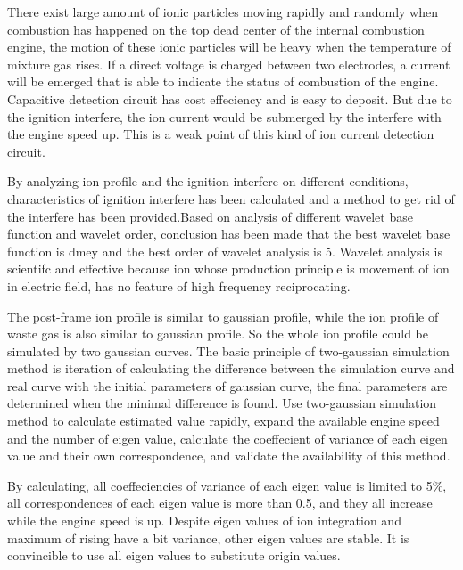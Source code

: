 \begin{eabstract}
There exist large amount of ionic particles moving rapidly and randomly when combustion has happened on the top dead
 center of the internal combustion engine, the motion of these ionic particles will be heavy when the temperature of 
 mixture gas rises. If a direct voltage is charged between two electrodes, a current will be emerged that is able to indicate
 the status of combustion of the engine. Capacitive detection circuit has cost effeciency and is easy to deposit. 
But due to the ignition interfere, the ion current would be submerged by the interfere with the engine speed up.
This is a weak point of this kind of ion current detection circuit.\par
By analyzing ion profile and the ignition interfere on different conditions, characteristics of ignition interfere has been calculated and 
a method to get rid of the interfere has been provided.Based on analysis of different wavelet base function and wavelet order, conclusion has
been made that the best wavelet base function is dmey and the best order of wavelet analysis is 5. Wavelet analysis is scientifc and effective because
 ion whose production principle is movement of ion in electric field,  has no feature of high frequency reciprocating. \par
 The post-frame ion profile is similar to gaussian profile, while the ion profile of waste gas is also similar to gaussian profile. So the whole
 ion profile could be simulated by two gaussian curves. The basic principle of two-gaussian simulation method is iteration of calculating the difference between
  the simulation curve and real curve with the initial parameters of gaussian curve, the final parameters are determined when the minimal difference is found.
 Use two-gaussian simulation method to calculate estimated value rapidly, expand the available
 engine speed and the number of eigen value, calculate the coeffecient of variance of each eigen value and their own correspondence, and validate the availability of 
 this method.\par
By calculating, all coeffeciencies of variance of each eigen value is limited to 5\%, all correspondences of each eigen value is more than 0.5, and they all increase
while the engine speed is up. Despite eigen values of ion integration and maximum of rising have a bit variance, other eigen values are stable.
It is convincible to use all eigen values to substitute origin values.
\end{eabstract}

